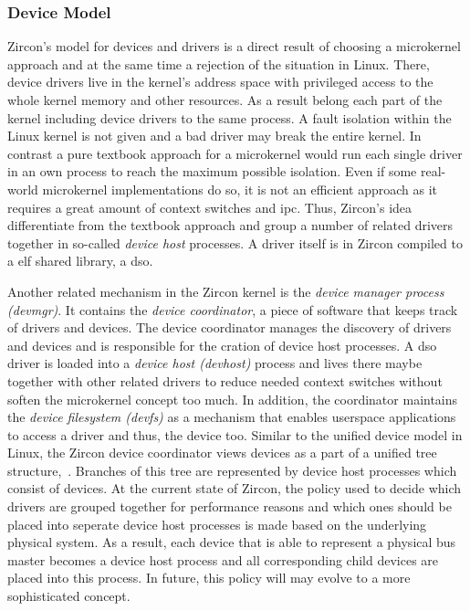 \subsubsection*{Device Model}
Zircon's model for devices and drivers is a direct result of choosing a microkernel approach and at the same time a rejection of the situation in Linux.
There, device drivers live in the kernel's address space with privileged access to the whole kernel memory and other resources.
As a result belong each part of the kernel including device drivers to the same process.
A fault isolation within the Linux kernel is not given and a bad driver may break the entire kernel. 
In contrast a pure textbook approach for a microkernel would run each single driver in an own process to reach the maximum possible isolation.
Even if some real-world microkernel implementations do so, it is not an efficient approach as it requires a great amount of context switches and \ac{ipc}\cite{zircon-ddk-gettingstarted}.
Thus, Zircon's idea differentiate from the textbook approach and group a number of related drivers together in so-called \textit{device host} processes\cite{zircon-ddk-gettingstarted}.
A driver itself is in Zircon compiled to a \acf{elf} shared library, a \ac{dso}.

Another related mechanism in the Zircon kernel is the \textit{device manager process (devmgr)}.
It contains the \textit{device coordinator}, a piece of software that keeps track of drivers and devices.
The device coordinator manages the discovery of drivers and devices and is responsible for the cration of device host processes.
A \ac{dso} driver is loaded into a \textit{device host (devhost)} process and lives there maybe together with other related drivers to reduce needed context switches without soften the microkernel concept too much.
In addition, the coordinator maintains the \textit{device filesystem (devfs)} as a mechanism that enables userspace applications to access a driver and thus, the device too.
Similar to the unified device model in Linux, the Zircon device coordinator views devices as a part of a unified tree structure\cite{zircon-devicemodel},~\cite{zircon-ddk-gettingstarted}.
Branches of this tree are represented by device host processes which consist of devices.
At the current state of Zircon, the policy used to decide which drivers are grouped together for performance reasons and which ones should be placed into seperate device host processes is made based on the underlying physical system.
As a result, each device that is able to represent a physical bus master becomes a device host process and all corresponding child devices are placed into this process.
In future, this policy will may evolve to a more sophisticated concept\cite{zircon-devicemodel}.


